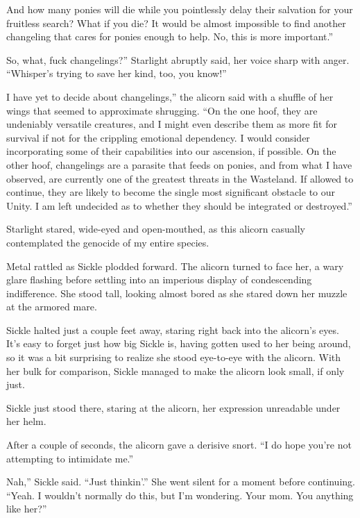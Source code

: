 \leavevmode{}And how many ponies will die while you pointlessly delay their salvation for your fruitless search? What if you die? It would be almost impossible to find another changeling that cares for ponies enough to help. No, this is more important.”

\leavevmode{}So, what, fuck changelings?” Starlight abruptly said, her voice sharp with anger. “Whisper’s trying to save her kind, too, you know!”

\leavevmode{}I have yet to decide about changelings,” the alicorn said with a shuffle of her wings that seemed to approximate shrugging. “On the one hoof, they are undeniably versatile creatures, and I might even describe them as more fit for survival if not for the crippling emotional dependency. I would consider incorporating some of their capabilities into our ascension, if possible. On the other hoof, changelings are a parasite that feeds on ponies, and from what I have observed, are currently one of the greatest threats in the Wasteland. If allowed to continue, they are likely to become the single most significant obstacle to our Unity. I am left undecided as to whether they should be integrated or destroyed.”

Starlight stared, wide-eyed and open-mouthed, as this alicorn casually contemplated the genocide of my entire species.

Metal rattled as Sickle plodded forward. The alicorn turned to face her, a wary glare flashing before settling into an imperious display of condescending indifference. She stood tall, looking almost bored as she stared down her muzzle at the armored mare.

Sickle halted just a couple feet away, staring right back into the alicorn’s eyes. It’s easy to forget just how big Sickle is, having gotten used to her being around, so it was a bit surprising to realize she stood eye-to-eye with the alicorn. With her bulk for comparison, Sickle managed to make the alicorn look small, if only just.

Sickle just stood there, staring at the alicorn, her expression unreadable under her helm.

After a couple of seconds, the alicorn gave a derisive snort. “I do hope you’re not attempting to intimidate me.”

\leavevmode{}Nah,” Sickle said. “Just thinkin’.” She went silent for a moment before continuing. “Yeah. I wouldn’t normally do this, but I’m wondering. Your mom. You anything like her?”

